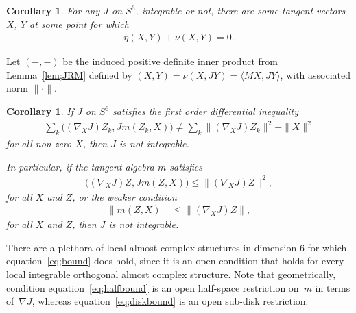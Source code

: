 \documentclass[10pt,a4paper]{amsart}
\newtheorem{cor}[thm]{Corollary}
\numberwithin{equation}{section}
\begin{document}
\begin{cor} For any $J$ on $S^{6}$, integrable or not, there are some tangent vectors $X$, $Y$ at some point for which
\begin{gather*}
 \eta(X,Y) + \nu( X , Y ) = 0.
\end{gather*}
\end{cor}

Let $( - , - )$ be the induced positive definite inner product from Lemma~\ref{lem;JRM} defined by $ ( X,Y) = \nu(X,JY) = \langle MX, JY \rangle$, with associated norm $\| \cdot \|$.

\begin{cor} \label{cor;bound}If $J$ on $S^6$ satisfies the first order differential inequality
\begin{gather} \label{eq;bound}
\sum_k \big( (\nabla_X J) Z_k, J m(Z_k,X) \big) \neq \sum_k \| (\nabla_X J) Z_k \|^2 + \|X\|^2
\end{gather}
for all non-zero $X$, then $J$ is not integrable.

In particular, if the tangent algebra $m$ satisfies
\begin{gather} \label{eq;halfbound}
\big( ( \nabla_X J ) Z, J m(Z,X) \big) \leq \| ( \nabla_X J ) Z \|^2 ,
\end{gather}
for all $X$ and $Z$, or the weaker condition
\begin{gather} \label{eq;diskbound}
\| m(Z,X) \| \leq \| (\nabla_X J) Z \|,
\end{gather}
for all $X$ and $Z$, then $J$ is not integrable.
\end{cor}

There are a plethora of local almost complex structures in dimension $6$ for which equation~\eqref{eq;bound} does hold, since it is an open condition that holds for every local integrable orthogonal almost complex structure. Note that geometrically, condition equation~\eqref{eq;halfbound} is an open half-space restriction on~$m$ in terms of~$\nabla J$, whereas equation~\eqref{eq;diskbound} is an open sub-disk restriction.
\end{document}
